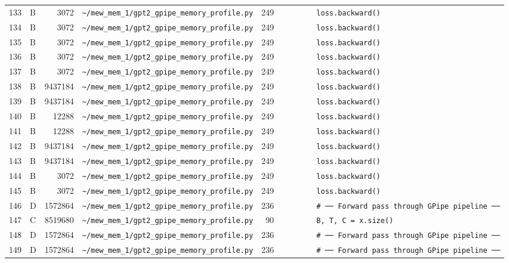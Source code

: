 \documentclass{article}
\begin{document}
\begin{longtable}{r l r p{6.5cm} r p{7.0cm}}
133 & B & 3072 & \lstinline|~/mew_mem_1/gpt2_gpipe_memory_profile.py| & 249 & \lstinline|        loss.backward()| \\
134 & B & 3072 & \lstinline|~/mew_mem_1/gpt2_gpipe_memory_profile.py| & 249 & \lstinline|        loss.backward()| \\
135 & B & 3072 & \lstinline|~/mew_mem_1/gpt2_gpipe_memory_profile.py| & 249 & \lstinline|        loss.backward()| \\
136 & B & 3072 & \lstinline|~/mew_mem_1/gpt2_gpipe_memory_profile.py| & 249 & \lstinline|        loss.backward()| \\
137 & B & 3072 & \lstinline|~/mew_mem_1/gpt2_gpipe_memory_profile.py| & 249 & \lstinline|        loss.backward()| \\
138 & B & 9437184 & \lstinline|~/mew_mem_1/gpt2_gpipe_memory_profile.py| & 249 & \lstinline|        loss.backward()| \\
139 & B & 9437184 & \lstinline|~/mew_mem_1/gpt2_gpipe_memory_profile.py| & 249 & \lstinline|        loss.backward()| \\
140 & B & 12288 & \lstinline|~/mew_mem_1/gpt2_gpipe_memory_profile.py| & 249 & \lstinline|        loss.backward()| \\
141 & B & 12288 & \lstinline|~/mew_mem_1/gpt2_gpipe_memory_profile.py| & 249 & \lstinline|        loss.backward()| \\
142 & B & 9437184 & \lstinline|~/mew_mem_1/gpt2_gpipe_memory_profile.py| & 249 & \lstinline|        loss.backward()| \\
143 & B & 9437184 & \lstinline|~/mew_mem_1/gpt2_gpipe_memory_profile.py| & 249 & \lstinline|        loss.backward()| \\
144 & B & 3072 & \lstinline|~/mew_mem_1/gpt2_gpipe_memory_profile.py| & 249 & \lstinline|        loss.backward()| \\
145 & B & 3072 & \lstinline|~/mew_mem_1/gpt2_gpipe_memory_profile.py| & 249 & \lstinline|        loss.backward()| \\
146 & D & 1572864 & \lstinline|~/mew_mem_1/gpt2_gpipe_memory_profile.py| & 236 & \lstinline|        # ── Forward pass through GPipe pipeline ──| \\
147 & C & 8519680 & \lstinline|~/mew_mem_1/gpt2_gpipe_memory_profile.py| & 90 & \lstinline|        B, T, C = x.size()| \\
148 & D & 1572864 & \lstinline|~/mew_mem_1/gpt2_gpipe_memory_profile.py| & 236 & \lstinline|        # ── Forward pass through GPipe pipeline ──| \\
149 & D & 1572864 & \lstinline|~/mew_mem_1/gpt2_gpipe_memory_profile.py| & 236 & \lstinline|        # ── Forward pass through GPipe pipeline ──| \\

\end{longtable}
\end{document}
